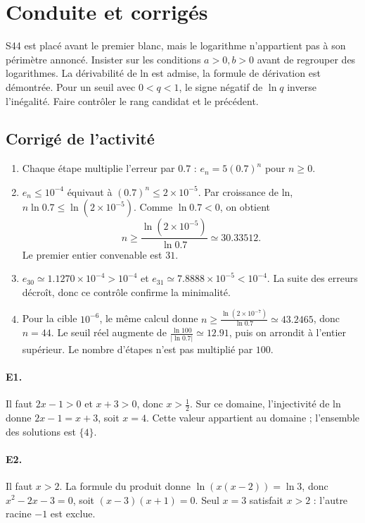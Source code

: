 \ifmxteacher\mxnewpage\section{Conduite et corrigés}\begin{teachernote}S44 est placé avant le premier blanc, mais le logarithme n'appartient pas à son périmètre annoncé. Insister sur les conditions $a>0,b>0$ avant de regrouper des logarithmes. La dérivabilité de ln est admise, la formule de dérivation est démontrée. Pour un seuil avec $0<q<1$, le signe négatif de $\ln q$ inverse l'inégalité. Faire contrôler le rang candidat et le précédent.\end{teachernote}

\subsection{Corrigé de l'activité}\begin{enumerate}
\item Chaque étape multiplie l'erreur par $\num{0,7}$ : $e_n=5(\num{0,7})^n$ pour $n\ge0$.
\item $e_n\le10^{-4}$ équivaut à $(\num{0,7})^n\le2\times10^{-5}$. Par croissance de ln, $n\ln\num{0,7}\le\ln(2\times10^{-5})$. Comme $\ln\num{0,7}<0$, on obtient
\[n\ge\frac{\ln(2\times10^{-5})}{\ln\num{0,7}}\simeq\num{30,33512}.\]
Le premier entier convenable est $31$.
\item $e_{30}\simeq\num{1,1270}\times10^{-4}>10^{-4}$ et $e_{31}\simeq\num{7,8888}\times10^{-5}<10^{-4}$. La suite des erreurs décroît, donc ce contrôle confirme la minimalité.
\item Pour la cible $10^{-6}$, le même calcul donne $n\ge\frac{\ln (2\times10^{-7})}{\ln \num{0,7}}\simeq\num{43,2465}$, donc $n=44$. Le seuil réel augmente de $\frac{\ln 100}{|\ln\num{0,7}|}\simeq\num{12,91}$, puis on arrondit à l'entier supérieur. Le nombre d'étapes n'est pas multiplié par $100$.
\end{enumerate}

\paragraph{E1.}Il faut $2x-1>0$ et $x+3>0$, donc $x>\frac{1}{2}$. Sur ce domaine, l'injectivité de ln donne $2x-1=x+3$, soit $x=4$. Cette valeur appartient au domaine ; l'ensemble des solutions est $\{4\}$.

\paragraph{E2.}Il faut $x>2$. La formule du produit donne $\ln(x(x-2))=\ln3$, donc $x^2-2x-3=0$, soit $(x-3)(x+1)=0$. Seul $x=3$ satisfait $x>2$ : l'autre racine $-1$ est exclue.

